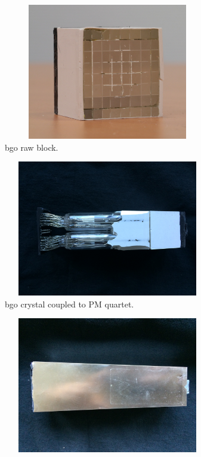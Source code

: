 \begin{figure}
\begin{subfigure}[b]{.5\textwidth}
\centering
\includegraphics[width=1\textwidth, height=16em]{03_GraphicFiles/chapter3_CLaRySproto/Absorber/images/block_noPM}
\caption{\gls{bgo} raw block.}
\label{chap3::fig::block_noPM}
\end{subfigure}
\begin{subfigure}[b]{.5\textwidth}
\centering
\includegraphics[width=1\textwidth, height=16em]{03_GraphicFiles/chapter3_CLaRySproto/Absorber/images/originalBlock_noAluminum}
\caption{\gls{bgo} crystal coupled to \gls{PM} quartet.}
\label{chap3::fig::originalBlock_noAl}
\end{subfigure}
\begin{subfigure}[b]{.5\textwidth}
\centering
\includegraphics[width=1\textwidth, height=16em]{03_GraphicFiles/chapter3_CLaRySproto/Absorber/images/originalBlock_withAluminum}

\end{subfigure}
\end{figure}
